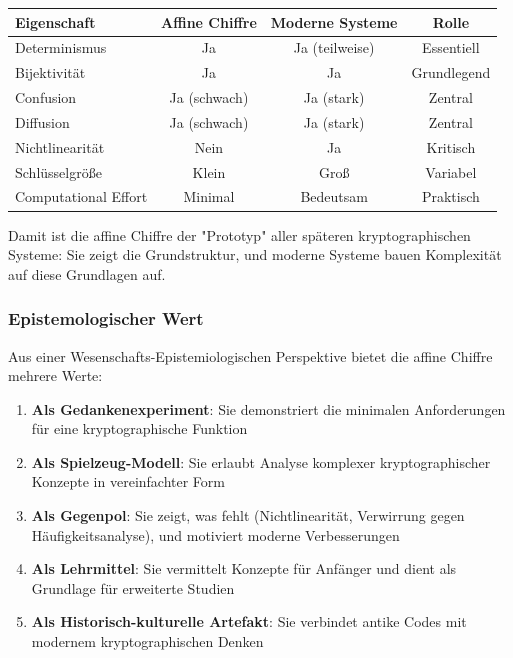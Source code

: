 ﻿\documentclass[12pt,a4paper]{article}
\begin{document}
	\begin{center}
		\begin{tabular}{|l|c|c|c|}
			\hline
			\textbf{Eigenschaft} & \textbf{Affine Chiffre} & \textbf{Moderne Systeme} & \textbf{Rolle} \\
			\hline\hline
			Determinismus & Ja & Ja (teilweise) & Essentiell \\
			Bijektivität & Ja & Ja & Grundlegend \\
			Confusion & Ja (schwach) & Ja (stark) & Zentral \\
			Diffusion & Ja (schwach) & Ja (stark) & Zentral \\
			Nichtlinearität & Nein & Ja & Kritisch \\
			Schlüsselgröße & Klein & Groß & Variabel \\
			Computational Effort & Minimal & Bedeutsam & Praktisch \\
			\hline
		\end{tabular}
	\end{center}
	
	Damit ist die affine Chiffre der "Prototyp" aller späteren kryptographischen Systeme: Sie zeigt die Grundstruktur, und moderne Systeme bauen Komplexität auf diese Grundlagen auf.
	
	\subsubsection{Epistemologischer Wert}
	
	Aus einer Wesenschafts-Epistemiologischen Perspektive bietet die affine Chiffre mehrere Werte:
	
	\begin{enumerate}
		\item \textbf{Als Gedankenexperiment}: Sie demonstriert die minimalen Anforderungen für eine kryptographische Funktion
		\item \textbf{Als Spielzeug-Modell}: Sie erlaubt Analyse komplexer kryptographischer Konzepte in vereinfachter Form
		\item \textbf{Als Gegenpol}: Sie zeigt, was fehlt (Nichtlinearität, Verwirrung gegen Häufigkeitsana\-lyse), und motiviert moderne Verbesserungen
		\item \textbf{Als Lehrmittel}: Sie vermittelt Konzepte für Anfänger und dient als Grundlage für erweiterte Studien
		\item \textbf{Als Historisch-kulturelle Artefakt}: Sie verbindet antike Codes mit modernem kryptographischen Denken
	\end{enumerate}
	
\end{document}
